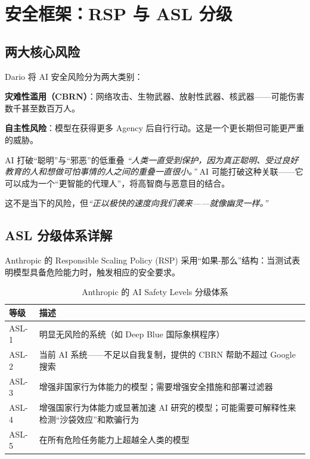 \section{安全框架：RSP 与 ASL 分级}

\subsection{两大核心风险}

Dario 将 AI 安全风险分为两大类别：

\textbf{灾难性滥用（CBRN）}：网络攻击、生物武器、放射性武器、核武器——可能伤害数千甚至数百万人。

\textbf{自主性风险}：模型在获得更多 Agency 后自行行动。这是一个更长期但可能更严重的威胁。

\begin{warningbox}{AI 打破``聪明''与``邪恶''的低重叠}
\textit{``人类一直受到保护，因为真正聪明、受过良好教育的人和想做可怕事情的人之间的重叠一直很小。''} AI 可能打破这种关联——它可以成为一个``更智能的代理人''，将高智商与恶意目的结合。

这不是当下的风险，但\textit{``正以极快的速度向我们袭来——就像幽灵一样。''}
\end{warningbox}

\subsection{ASL 分级体系详解}

Anthropic 的 Responsible Scaling Policy (RSP) 采用``如果-那么''结构：当测试表明模型具备危险能力时，触发相应的安全要求。

\begin{table}[H]
\centering
\begin{tabular}{lp{9cm}}
\toprule
\textbf{等级} & \textbf{描述} \\
\midrule
ASL-1 & 明显无风险的系统（如 Deep Blue 国际象棋程序） \\
ASL-2 & 当前 AI 系统——不足以自我复制，提供的 CBRN 帮助不超过 Google 搜索 \\
ASL-3 & 增强非国家行为体能力的模型；需要增强安全措施和部署过滤器 \\
ASL-4 & 增强国家行为体能力或显著加速 AI 研究的模型；可能需要可解释性来检测``沙袋效应''和欺骗行为 \\
ASL-5 & 在所有危险任务能力上超越全人类的模型 \\
\bottomrule
\end{tabular}
\caption{Anthropic 的 AI Safety Levels 分级体系}
\end{table}

